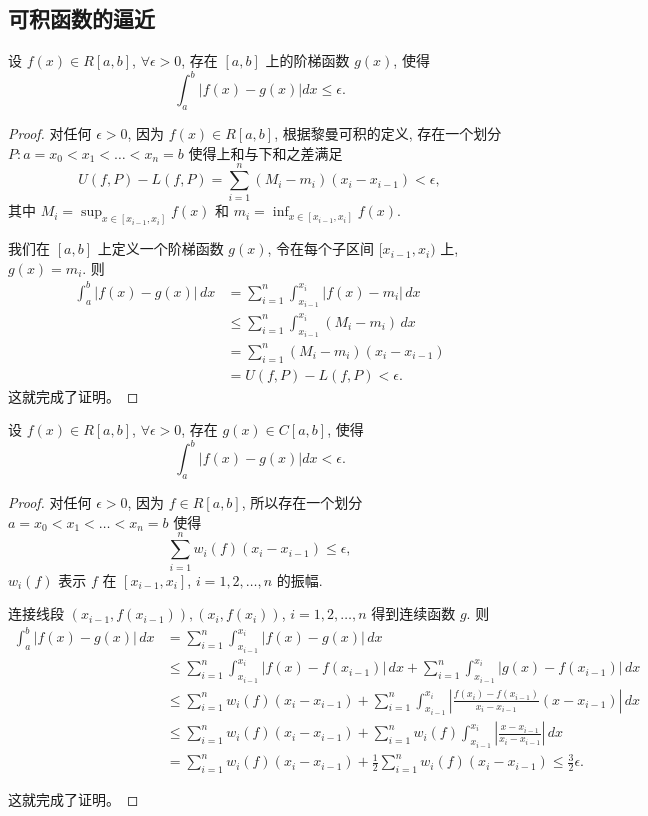 \documentclass[lang=cn,10pt,thmcnt=section]{elegantbook}
\begin{document}
\subsection{可积函数的逼近}
\begin{example}[阶梯逼近]
	设 \( f(x) \in R[a,b] \), \(\forall \epsilon > 0\), 存在 \([a,b]\) 上的阶梯函数 \( g(x) \), 使得 
\[ \int_{a}^{b} |f(x)-g(x)|dx \leq \epsilon. \]
\end{example}
\begin{proof}
    对任何 $\epsilon > 0$, 因为 $f(x) \in R[a,b]$, 根据黎曼可积的定义, 存在一个划分 $P: a = x_0 < x_1 < \dots < x_n = b$ 使得上和与下和之差满足
    \[
        U(f,P) - L(f,P) = \sum_{i=1}^n (M_i - m_i)(x_i - x_{i-1}) < \epsilon,
    \]
    其中 $M_i = \sup_{x \in [x_{i-1},x_i]} f(x)$ 和 $m_i = \inf_{x \in [x_{i-1},x_i]} f(x)$.

    我们在 $[a,b]$ 上定义一个阶梯函数 $g(x)$, 令在每个子区间 $[x_{i-1}, x_i)$ 上, $g(x) = m_i$. 则
    \begin{align*}
        \int_a^b |f(x) - g(x)| \, dx &= \sum_{i=1}^n \int_{x_{i-1}}^{x_i} |f(x) - m_i| \, dx \\
        &\le \sum_{i=1}^n \int_{x_{i-1}}^{x_i} (M_i - m_i) \, dx \\
        &= \sum_{i=1}^n (M_i - m_i)(x_i - x_{i-1}) \\
        &= U(f,P) - L(f,P) < \epsilon.
    \end{align*}
    这就完成了证明。
\end{proof}
\begin{example}[连续逼近]
	设 \( f(x) \in R[a,b] \), \(\forall \epsilon > 0\), 存在 \( g(x) \in C[a,b] \), 使得 
\[ \int_{a}^{b} |f(x)-g(x)|dx < \epsilon. \]
\end{example}
\begin{proof}
	对任何 $\epsilon > 0$, 因为 $f \in R[a, b]$, 所以存在一个划分 $a = x_0 < x_1 < \dots < x_n = b$ 使得
\[
\sum_{i=1}^n w_i(f)(x_i - x_{i-1}) \le \epsilon,
\]
$w_i(f)$ 表示 $f$ 在 $[x_{i-1}, x_i]$, $i=1, 2, \dots, n$ 的振幅.

连接线段 $(x_{i-1}, f(x_{i-1})), (x_i, f(x_i))$, $i=1, 2, \dots, n$ 得到连续函数 $g$. 则
\begin{align*}
\int_a^b |f(x) - g(x)| \, dx &= \sum_{i=1}^n \int_{x_{i-1}}^{x_i} |f(x) - g(x)| \, dx \\
&\le \sum_{i=1}^n \int_{x_{i-1}}^{x_i} |f(x) - f(x_{i-1})| \, dx + \sum_{i=1}^n \int_{x_{i-1}}^{x_i} |g(x) - f(x_{i-1})| \, dx \\
&\le \sum_{i=1}^n w_i(f)(x_i - x_{i-1}) + \sum_{i=1}^n \int_{x_{i-1}}^{x_i} \left| \frac{f(x_i) - f(x_{i-1})}{x_i - x_{i-1}} (x - x_{i-1}) \right| \, dx \\
&\le \sum_{i=1}^n w_i(f)(x_i - x_{i-1}) + \sum_{i=1}^n w_i(f) \int_{x_{i-1}}^{x_i} \left| \frac{x - x_{i-1}}{x_i - x_{i-1}} \right| \, dx \\
&= \sum_{i=1}^n w_i(f)(x_i - x_{i-1}) + \frac{1}{2} \sum_{i=1}^n w_i(f)(x_i - x_{i-1}) \le \frac{3}{2}\epsilon.
\end{align*}

这就完成了证明。
\end{proof}
\end{document}
